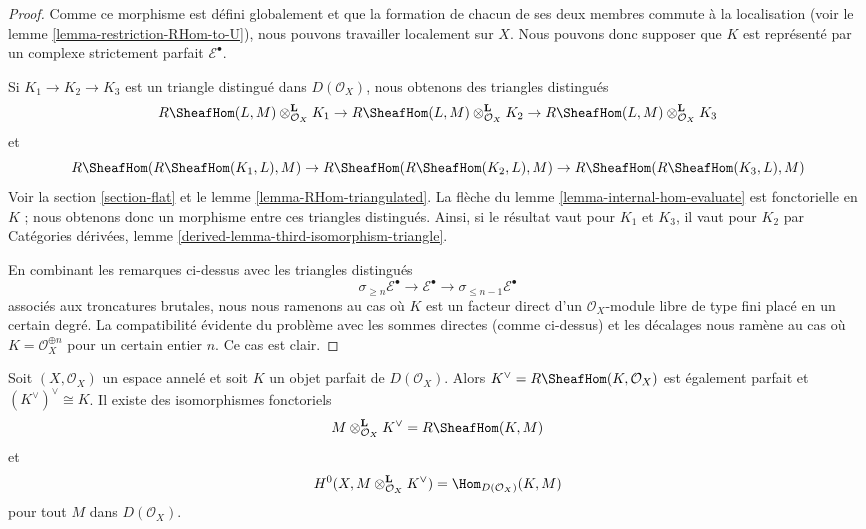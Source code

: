 \begin{proof}
Comme ce morphisme est défini globalement et que la formation de chacun de ses deux membres commute à la localisation (voir le lemme \ref{lemma-restriction-RHom-to-U}), nous pouvons travailler localement sur $X$. Nous pouvons donc supposer que $K$ est représenté par un complexe strictement parfait $\mathcal{E}^\bullet$.

\medskip\noindent
Si $K_1 \to K_2 \to K_3$ est un triangle distingué dans $D(\mathcal{O}_X)$, nous obtenons des triangles distingués $$
R\SheafHom(L, M) \otimes_{\mathcal{O}_X}^\mathbf{L} K_1 \to
R\SheafHom(L, M) \otimes_{\mathcal{O}_X}^\mathbf{L} K_2 \to
R\SheafHom(L, M) \otimes_{\mathcal{O}_X}^\mathbf{L} K_3
$$ et $$
R\SheafHom(R\SheafHom(K_1, L), M) \to
R\SheafHom(R\SheafHom(K_2, L), M) \to
R\SheafHom(R\SheafHom(K_3, L), M)
$$ Voir la section \ref{section-flat} et le lemme \ref{lemma-RHom-triangulated}. La flèche du lemme \ref{lemma-internal-hom-evaluate} est fonctorielle en $K$ ; nous obtenons donc un morphisme entre ces triangles distingués. Ainsi, si le résultat vaut pour $K_1$ et $K_3$, il vaut pour $K_2$ par Catégories dérivées, lemme \ref{derived-lemma-third-isomorphism-triangle}.

\medskip\noindent
En combinant les remarques ci-dessus avec les triangles distingués $$
\sigma_{\geq n}\mathcal{E}^\bullet \to \mathcal{E}^\bullet \to
\sigma_{\leq n - 1}\mathcal{E}^\bullet
$$ associés aux troncatures brutales, nous nous ramenons au cas où $K$ est un facteur direct d'un $\mathcal{O}_X$-module libre de type fini placé en un certain degré. La compatibilité évidente du problème avec les sommes directes (comme ci-dessus) et les décalages nous ramène au cas où $K = \mathcal{O}_X^{\oplus n}$ pour un certain entier $n$. Ce cas est clair.
\end{proof}

\begin{lemma}

\label{lemma-dual-perfect-complex}
Soit $(X, \mathcal{O}_X)$ un espace annelé et soit $K$ un objet parfait de $D(\mathcal{O}_X)$. Alors $K^\vee = R\SheafHom(K, \mathcal{O}_X)$ est également parfait et $(K^\vee)^\vee \cong K$. Il existe des isomorphismes fonctoriels $$
M \otimes^\mathbf{L}_{\mathcal{O}_X} K^\vee = R\SheafHom(K, M)
$$ et $$
H^0(X, M \otimes^\mathbf{L}_{\mathcal{O}_X} K^\vee) =
\Hom_{D(\mathcal{O}_X)}(K, M)
$$ pour tout $M$ dans $D(\mathcal{O}_X)$.
\end{lemma}

